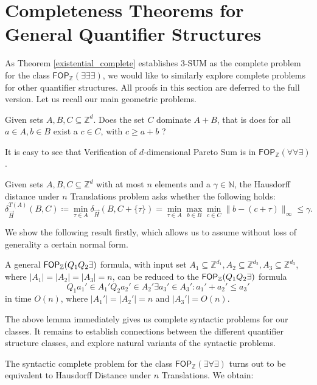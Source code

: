 \section{Completeness Theorems for General Quantifier Structures}\label{sec:GeneralQuantifier}
As Theorem \ref{existential_complete} establishes $3$-SUM as the complete problem for the class $\mathsf{FOP}_{\mathbb{Z}}(\exists \exists \exists)$,
we would like to similarly explore complete problems for other quantifier structures. All proofs in this section are deferred to the full version.
Let us recall our main geometric problems.
    \begin{definition}
        Given sets $A,B,C \subseteq \mathbb{Z}^d$. Does the set $C$ dominate $A+B$, that is does for all $a \in A ,b \in B$ exist a $c \in C$, with $c \geq a+b$ ?
      \end{definition}
It is easy to see that Verification of $d$-dimensional Pareto Sum is in $\mathsf{FOP}_{\mathbb{Z}}(\forall \forall \exists)$.

\begin{definition}
  Given sets $A,B,C \subseteq \mathbb{Z}^d$ with at most $n$ elements and a $\gamma\in \mathbb{N}$, the Hausdorff distance under $n$ Translations problem asks whether the following holds:
   \[\delta_{\overrightarrow{H}}^{T(A)}(B,C) \coloneqq \min_{\tau \in A} \delta_{\overrightarrow{H}}(B,C+\{\tau\}) = \min_{\tau \in A} \max_{b\in B} \min_{c\in C} \|b-(c+\tau)\|_{\infty}\leq \gamma.\]
  \end{definition}

We show the following result firstly, which allows us to assume without loss of generality a certain normal form.
\begin{lemma}
A general $\mathsf{FOP}_{\mathbb{Z}}(Q_1Q_2\exists)$ formula, with input set $A_1 \subseteq \mathbb{Z}^{d_1}, A_2 \subseteq \mathbb{Z}^{d_2},A_3 \subseteq \mathbb{Z}^{d_3} $, where $|A_1|=|A_2|=|A_3|=n$,
can be reduced to the $\mathsf{FOP}_{\mathbb{Z}}(Q_1Q_2\exists)$ formula
$$Q_1 a_1'\in A_1' Q_2 a_2' \in A_2' \exists a_3' \in A_3':a_1'+a_2' \leq a_3'$$ in time $O(n)$, where
$|A_1'|=|A_2'|=n$ and $|A_3'|=O(n)$. 
\label{normalform}
\end{lemma}
The above lemma immediately gives us complete syntactic problems for our classes.
It remains to establish connections between the different quantifier structure classes, and explore natural variants of the syntactic problems.

The syntactic complete problem for the class $\mathsf{FOP}_{\mathbb{Z}}(\exists \forall \exists)$ turns out to be equivalent to Hausdorff Distance under $n$ Translations. We obtain:

